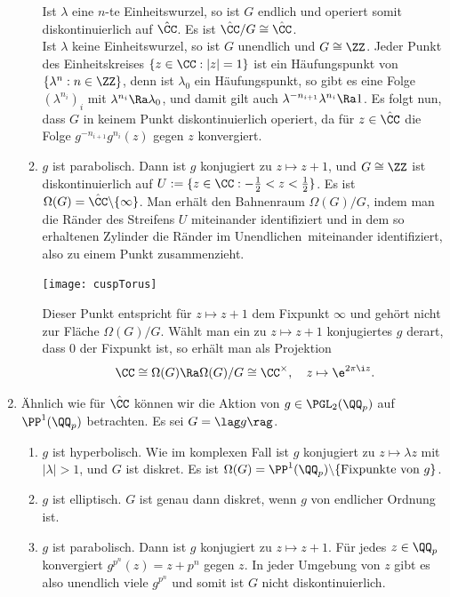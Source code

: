 \begin{enumerate}
\begin{enumerate}
Ist $\lambda$ eine $n$-te Einheitswurzel, so ist $G$ endlich und
operiert somit diskontinuierlich auf $\hat{\CC}$.
Es ist $\hat{\CC}/G\cong\hat{\CC}$.\\
Ist $\lambda$ keine Einheitswurzel, so ist $G$ unendlich und
$G\cong\ZZ$. Jeder Punkt des Einheitskreises $\{z\in\CC:|z|=1\}$
ist ein Häufungspunkt von $\{\lambda^n:n\in\ZZ\}$, denn ist
$\lambda_0$ ein Häufungspunkt, so gibt es eine Folge
$(\lambda^{n_i})_i$ mit $\lambda^{n_i}\Ra\lambda_0$,
und damit gilt auch $\lambda^{-n_{i+1}}\lambda^{n_i}\Ra 1$.
Es folgt nun, dass $G$ in keinem Punkt diskontinuierlich operiert,
da für $z\in\hat{\CC}$ die Folge $g^{-n_{i+1}}g^{n_i}(z)$ gegen
$z$ konvergiert.
\item $g$ ist parabolisch.
Dann ist $g$ konjugiert zu $z\mapsto z+1$, und $G\cong \ZZ$ ist
diskontinuierlich auf $U:=\{z\in\CC:-\frac{1}{2}<z<\frac{1}{2}\}$.
Es ist $\Omega(G)=\hat{\CC}\backslash\{\infty\}$.
Man erhält den Bahnenraum $\Omega(G)/G$, indem man die Ränder
des Streifens $U$ miteinander identifiziert und in dem so 
erhaltenen Zylinder die \glqq Ränder im Unendlichen\grqq\
miteinander identifiziert, also zu einem Punkt zusammenzieht.
\begin{center}
	\texttt{[image: cuspTorus]}
\end{center}
Dieser Punkt entspricht für $z\mapsto z+1$ dem Fixpunkt $\infty$
und gehört nicht zur Fläche $\Omega(G)/G$.
Wählt man ein zu $z\mapsto z+1$ konjugiertes $g$ derart, dass
$0$ der Fixpunkt ist, so erhält man als Projektion
\[
\CC\cong \Omega(G) \Ra \Omega(G)/G\cong \CC^\times,\quad
z\mapsto \e^{2\pi\i z}.
\]
\end{enumerate}
\item Ähnlich wie für $\hat{\CC}$ können wir die Aktion von
$g\in\PGL_2(\QQ_p)$ auf $\PP^1(\QQ_p)$ betrachten.
Es sei $G=\lag g\rag$.
\begin{enumerate}
\item $g$ ist hyperbolisch. Wie im komplexen Fall ist $g$ konjugiert
zu $z\mapsto\lambda z$ mit $|\lambda|>1$, und $G$ ist diskret.
Es ist $\Omega(G)=\PP^1(\QQ_p)\backslash\{\text{Fixpunkte von }g\}$.
\item $g$ ist elliptisch. $G$ ist genau dann diskret, wenn
$g$ von endlicher Ordnung ist.
\item $g$ ist parabolisch. Dann ist $g$ konjugiert zu $z\mapsto z+1$.
Für jedes $z\in\QQ_p$ konvergiert $g^{p^n}(z)=z+p^n$ gegen $z$.
In jeder Umgebung von $z$ gibt es also unendlich viele $g^{p^n}$
und somit ist $G$ nicht diskontinuierlich.
\end{enumerate}
\end{enumerate}

